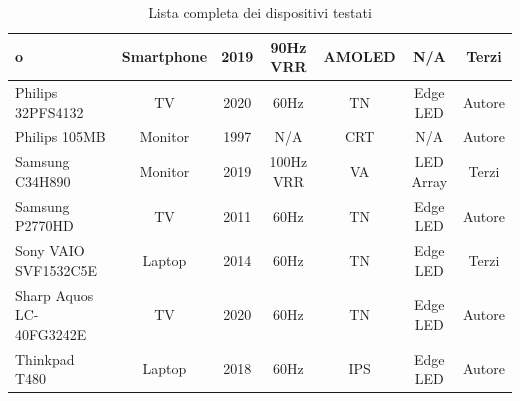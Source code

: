 \documentclass[xcolor={dvipsnames}]{beamer}
\begin{document}
\begin{frame}[shrink=10]
\begin{table}
{\begin{tabular}{|l|c|c|c|c|c|c|}
			\setbeamercolor*{palette secondary}{use=structure,fg=white,bg=structure.fg!75}
			\setbeamercolor*{palette tertiary}{use=structure,fg=white,bg=structure.fg!50!black}
			\setbeamercolor*{palette quaternary}{fg=white,bg=black}
			\setbeamercolor*{alerted text}{fg=RawSienna}o & Smartphone & 2019 & 90Hz VRR & AMOLED & N/A & Terzi \\ \hline
			Philips 32PFS4132 & TV & 2020 & 60Hz & TN & Edge LED & Autore \\ \hline
			Philips 105MB & Monitor & 1997 & N/A & CRT & N/A & Autore \\ \hline
			Samsung C34H890 & Monitor & 2019 & 100Hz VRR & VA & LED Array & Terzi \\ \hline
			Samsung P2770HD & TV & 2011 & 60Hz & TN & Edge LED & Autore \\ \hline
			Sony VAIO SVF1532C5E & Laptop & 2014 & 60Hz & TN & Edge LED & Terzi \\ \hline
			Sharp Aquos LC-40FG3242E & TV & 2020 & 60Hz & TN & Edge LED & Autore \\ \hline
			Thinkpad T480 & Laptop & 2018 & 60Hz & IPS & Edge LED & Autore \\ \hline
		\end{tabular}}
		\caption*{Lista completa dei dispositivi testati}
	\end{table}
\end{frame}
\end{document}
